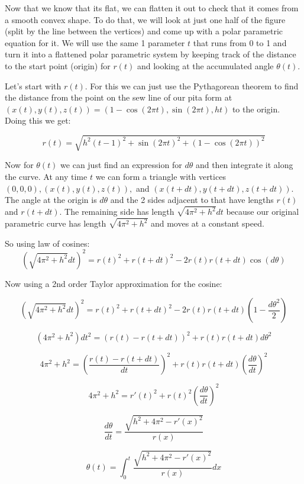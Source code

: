 \documentclass[12pt]{article}
\begin{document}
Now that we know that its flat, we can flatten it out to check that it comes from a smooth convex shape. To do that, we will look at just one half of the figure (split by the line between the vertices) and come up with a polar parametric equation for it. We will use the same 1 parameter $t$ that runs from 0 to 1 and turn it into a flattened polar parametric system by keeping track of the distance to the start point (origin) for $r(t)$ and looking at the accumulated angle $\theta (t)$. 

Let's start with $r(t)$. For this we can just use the Pythagorean theorem to find the distance from the point on the sew line of our pita form at  $(x(t), y(t), z(t)) = \left(1-\cos(2\pi t), \sin(2\pi t), ht \right)$ to the origin. Doing this we get:

$$ r(t) = \sqrt{h^2(t-1)^2+ \sin (2\pi t)^2+ (1-\cos(2\pi t))^2}$$

Now for $\theta(t)$ we can just find an expression for $d\theta$ and then integrate it along the curve. At any time $t$ we can form a triangle with vertices $(0, 0, 0), (x(t), y(t), z(t)),$ and $(x(t+dt), y(t+dt), z(t+dt))$. The angle at the origin is $d\theta$ and the 2 sides adjacent to that have lengths $r(t)$ and $r(t+dt)$. The remaining side has length $\sqrt{4 \pi^2 +h^2}dt$ because our original parametric curve has length $\sqrt{4 \pi^2 +h^2}$ and moves at a constant speed.

So using law of cosines:
$$\left(\sqrt{4 \pi^2 +h^2}dt\right)^2 = r(t)^2 + r(t+dt)^2 - 2r(t)r(t+dt)\cos ( d\theta)$$

Now using a 2nd order Taylor approximation for the cosine:

$$\left(\sqrt{4 \pi^2 +h^2}dt\right)^2 = r(t)^2 + r(t+dt)^2 - 2r(t)r(t+dt)\left(1- \frac{d\theta^2}{2}\right)$$

$$(4 \pi^2 +h^2)dt^2 = (r(t) - r(t+dt))^2 +r(t)r(t+dt)d\theta^2$$


$$4 \pi^2 +h^2= \left(\frac{r(t) - r(t+dt)}{dt}\right)^2 +r(t)r(t+dt)\left(\frac{d\theta}{dt}\right)^2$$

$$4 \pi^2 +h^2= r'(t)^2 +r(t)^2\left(\frac{d\theta}{dt}\right)^2$$

$$\frac{d\theta}{dt} = \frac{\sqrt{h^2 + 4 \pi^2 - r'(x)^2}}{r(x)} $$

$$\theta(t) = \int_0^t \frac{\sqrt{h^2 + 4 \pi^2 - r'(x)^2}}{r(x)} dx$$
\end{document}
